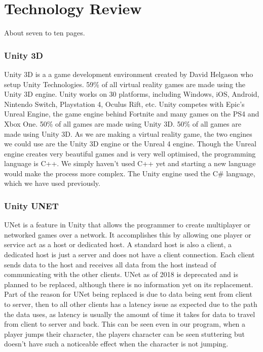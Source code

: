 
\chapter{Technology Review}
About seven to ten pages.

\subsection {Unity 3D}
Unity 3D is a a game development environment created by David Helgason who setup Unity Technologies. 59\% of all virtual reality games are made using the Unity 3D engine. Unity works on 30 platforms, including Windows, iOS, Android, Nintendo Switch, Playstation 4, Oculus Rift, etc. Unity competes with Epic’s Unreal Engine, the game engine behind Fortnite and many games on the PS4 and Xbox One. 50\% of all games are made using Unity 3D. 50\% of all games are made using Unity 3D. As we are making a virtual reality game, the two engines we could use are the Unity 3D engine or the Unreal 4 engine. Though the Unreal engine creates very beautiful games and is very well optimised, the programming language is C++. We simply haven't used C++ yet and starting a new language would make the process more complex. The Unity engine used the C# language, which we have used previously.

\subsection {Unity UNET}
UNet is a feature in Unity that allows the programmer to create multiplayer or networked games over a network. It accomplishes this by allowing one player or service act as a host or dedicated host. A standard host is also a client, a dedicated host is just a server and does not have a client connection. Each client sends data to the host and receives all data from the host instead of communicating with the other clients. UNet as of 2018 is deprecated and is planned to be replaced, although there is no information yet on its replacement. Part of the reason for UNet being replaced is due to data being sent from client to server, then to all other clients has a latency issue as expected due to the path the data uses, as latency is usually the amount of time it takes for data to travel from client to server and back. This can be seen even in our program, when a player jumps their character, the players character can be seen stuttering but doesn't have such a noticeable effect when the character is not jumping.


